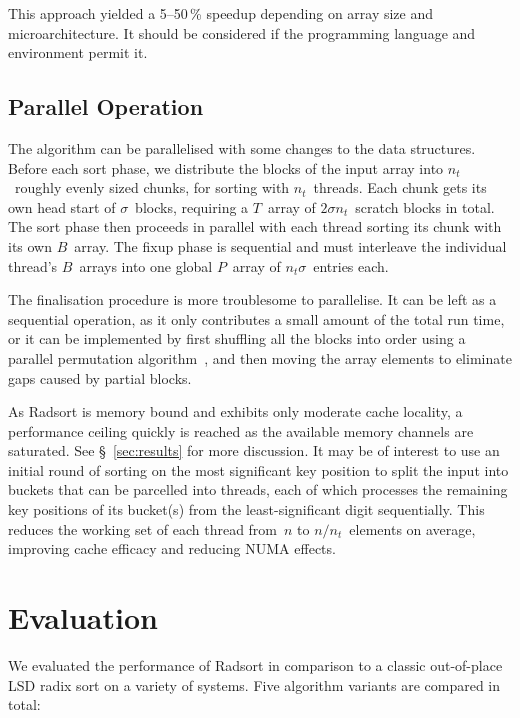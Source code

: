 \documentclass[nolineno,a4paper,UKenglish,cleveref, autoref, thm-restate]{socg-lipics-v2021}
\begin{document}
This approach yielded a 5--50\,\% speedup depending on array size
and microarchitecture.
It should be considered if the programming language and environment permit it.

\subsection{Parallel Operation}
The algorithm can be parallelised with some changes to the data structures.
Before each sort phase, we distribute the blocks of the input array into
$n_t$~roughly evenly sized chunks, for sorting with $n_t$~threads.
Each chunk gets its own head start of $\sigma$~blocks,
requiring a $T$~array of $2\sigma n_t$~scratch blocks in total.
The sort phase then proceeds in parallel with each thread sorting its chunk
with its own $B$~array.  The fixup phase is sequential and must interleave the
individual thread's $B$~arrays into one global $P$~array of $n_t\sigma$~entries each.

The finalisation procedure is more troublesome to parallelise.  It can be
left as a sequential operation, as it only contributes a small amount of the total
run time, or it can be implemented by first shuffling all the blocks into order using
a parallel permutation algorithm~\cite{Hagerup1995}, and then moving the array
elements to eliminate gaps caused by partial blocks.

As Radsort is memory bound and exhibits only moderate cache locality,
a performance ceiling quickly is reached as the available memory channels
are saturated.  See \S~\ref{sec:results} for more discussion.
It may be of interest to use an initial round of sorting on the most
significant key position to split the input into buckets that can be parcelled
into threads, each of which processes the remaining key positions of its
bucket(s) from the least-significant digit sequentially.  This reduces the
working set of each thread from~$n$ to $n/n_t$~elements on
average, improving cache efficacy and reducing NUMA effects.

\section{Evaluation}
We evaluated the performance of Radsort in comparison to a classic out-of-place
LSD radix sort on a variety of systems.
Five algorithm variants are compared in total:
\end{document}
